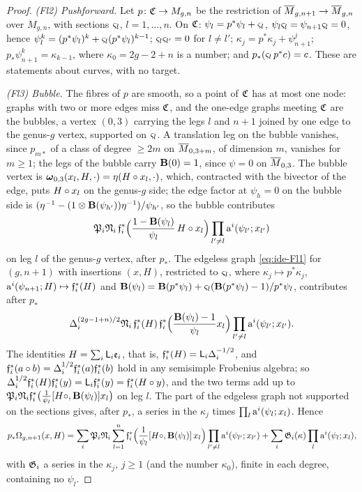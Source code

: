\begin{proof}
\emph{(Fl2) Pushforward.} Let $p\colon\mathfrak{C}\to M_{g,n}$ be the restriction of $\overline{M}_{g,n+1}\to\overline{M}_{g,n}$ over $M_{g,n}$, with sections $\varsigma_l$, $l=1,\dots,n$. On $\mathfrak{C}$: $\psi_l=p^*\psi_l+\varsigma_l$, $\psi_l\varsigma_l=\psi_{n+1}\varsigma_l=0$, hence $\psi_l^k=(p^*\psi_l)^k+\varsigma_l(p^*\psi_l)^{k-1}$; $\varsigma_l\varsigma_{l'}=0$ for $l\neq l'$; $\kappa_j=p^*\kappa_j+\psi_{n+1}^j$; $p_*\psi_{n+1}^k=\kappa_{k-1}$, where $\kappa_0=2g-2+n$ is a number; and $p_*(\varsigma_l\,p^*c)=c$. These are statements about curves, with no target.

\emph{(Fl3) Bubble.} The fibres of $p$ are smooth, so a point of $\mathfrak{C}$ has at most one node: graphs with two or more edges miss $\mathfrak{C}$, and the one-edge graphs meeting $\mathfrak{C}$ are the bubbles, a vertex $(0,3)$ carrying the legs $l$ and $n+1$ joined by one edge to the genus-$g$ vertex, supported on $\varsigma_l$. A translation leg on the bubble vanishes, since $p_{m*}$ of a class of degree $\geq 2m$ on $\overline{M}_{0,3+m}$, of dimension $m$, vanishes for $m\geq 1$; the legs of the bubble carry $\mathbf{B}(0)=1$, since $\psi=0$ on $\overline{M}_{0,3}$. The bubble vertex is $\boldsymbol{\omega}_{0,3}(x_l,H,\cdot)=\eta(H\circ x_l,\cdot)$, which, contracted with the bivector of the edge, puts $H\circ x_l$ on the genus-$g$ side; the edge factor at $\psi_h=0$ on the bubble side is $(\eta^{-1}-(1\otimes\mathbf{B}(\psi_{h'}))\eta^{-1})/\psi_{h'}$, so the bubble contributes
\[
\mathfrak{P}_i\mathfrak{N}_i\,\mathfrak{f}_i^*\Big(\frac{1-\mathbf{B}(\psi_l)}{\psi_l}\,H\circ x_l\Big)\prod_{l'\neq l}\mathrm{a}^{i}(\psi_{l'};x_{l'})
\]
on leg $l$ of the genus-$g$ vertex, after $p_*$. The edgeless graph \cref{eq:ide-Fl1} for $(g,n+1)$ with insertions $(x,H)$, restricted to $\varsigma_l$, where $\kappa_j\mapsto p^*\kappa_j$, $\mathrm{a}^{i}(\psi_{n+1};H)\mapsto\mathfrak{f}_i^*(H)$ and $\mathbf{B}(\psi_l)=\mathbf{B}(p^*\psi_l)+\varsigma_l(\mathbf{B}(p^*\psi_l)-1)/p^*\psi_l$, contributes after $p_*$
\[
\Delta_i^{(2g-1+n)/2}\mathfrak{N}_i\,\mathfrak{f}_i^*(H)\,\mathfrak{f}_i^*\Big(\frac{\mathbf{B}(\psi_l)-1}{\psi_l}x_l\Big)\prod_{l'\neq l}\mathrm{a}^{i}(\psi_{l'};x_{l'}).
\]
The identities $H=\sum_i\mathsf{L}_i\mathfrak{e}_i$, that is, $\mathfrak{f}_i^*(H)=\mathsf{L}_i\Delta_i^{-1/2}$, and $\mathfrak{f}_i^*(a\circ b)=\Delta_i^{1/2}\mathfrak{f}_i^*(a)\mathfrak{f}_i^*(b)$ hold in any semisimple Frobenius algebra; so $\Delta_i^{1/2}\mathfrak{f}_i^*(H)\mathfrak{f}_i^*(y)=\mathsf{L}_i\mathfrak{f}_i^*(y)=\mathfrak{f}_i^*(H\circ y)$, and the two terms add up to $\mathfrak{P}_i\mathfrak{N}_i\mathfrak{f}_i^*\big(\frac{1}{\psi_l}[H\circ,\mathbf{B}(\psi_l)]x_l\big)$ on leg $l$. The part of the edgeless graph not supported on the sections gives, after $p_*$, a series in the $\kappa_j$ times $\prod_l\mathrm{a}^{i}(\psi_l;x_l)$. Hence
\begin{equation}
\label{eq:ide-Fl3}
p_*\Omega_{g,n+1}(x,H)=\sum_i\mathfrak{P}_i\mathfrak{N}_i\sum_{l=1}^n\mathfrak{f}_i^*\Big(\frac{1}{\psi_l}[H\circ,\mathbf{B}(\psi_l)]\,x_l\Big)\prod_{l'\neq l}\mathrm{a}^{i}(\psi_{l'};x_{l'})+\sum_i\mathfrak{G}_i(\kappa)\prod_l\mathrm{a}^{i}(\psi_l;x_l),
\end{equation}
with $\mathfrak{G}_i$ a series in the $\kappa_j$, $j\geq 1$ (and the number $\kappa_0$), finite in each degree, containing no $\psi_l$.


\end{proof}
